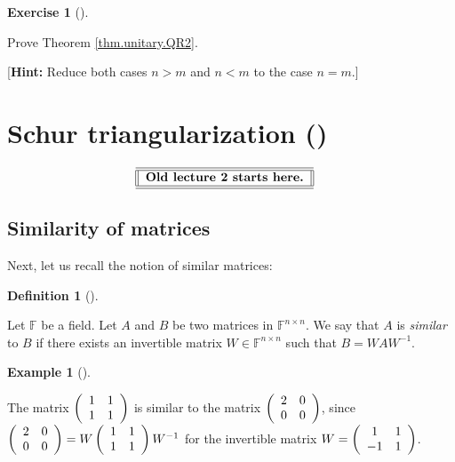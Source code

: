 \documentclass[numbers=enddot,12pt,final,onecolumn,notitlepage]{scrartcl}%
\newcounter{exer}
\numberwithin{exer}{subsection}
\theoremstyle{definition}
\newtheorem{defi}[theo]{Definition}
\newenvironment{definition}[1][]
{\begin{defi}[#1]\begin{leftbar}}
{\end{leftbar}\end{defi}}
\newtheorem{exam}[theo]{Example}
\newenvironment{example}[1][]
{\begin{exam}[#1]\begin{leftbar}}
{\end{leftbar}\end{exam}}
\newtheorem{exmp}[exer]{Exercise}
\newenvironment{exercise}[1][]
{\begin{exmp}[#1]\begin{leftbar}}
{\end{leftbar}\end{exmp}}
\newenvironment{noncompile}{}{}
\begin{document}
\begin{exercise}
\label{exe.unitary.QR2} Prove Theorem \ref{thm.unitary.QR2}.

[\textbf{Hint:} Reduce both cases $n>m$ and $n<m$ to the case $n=m$.]
\end{exercise}

\section{Schur triangularization (\cite[Chapter 2]{HorJoh13})}

\begin{noncompile}%
\[%
\begin{tabular}
[c]{||l||}\hline\hline
\textbf{Old lecture 2 starts here.}\\\hline\hline
\end{tabular}
\ \ \
\]

\end{noncompile}

\subsection{Similarity of matrices}

Next, let us recall the notion of similar matrices:

\begin{definition}
\label{def.schurtri.similar.def}Let $\mathbb{F}$ be a field. Let $A$ and $B$
be two matrices in $\mathbb{F}^{n\times n}$. We say that $A$ is \emph{similar}
to $B$ if there exists an invertible matrix $W\in\mathbb{F}^{n\times n}$ such
that $B=WAW^{-1}$.
\end{definition}

\begin{example}
The matrix $\left(
\begin{array}
[c]{cc}%
1 & 1\\
1 & 1
\end{array}
\right)  $ is similar to the matrix $\left(
\begin{array}
[c]{cc}%
2 & 0\\
0 & 0
\end{array}
\right)  $, since $\left(
\begin{array}
[c]{cc}%
2 & 0\\
0 & 0
\end{array}
\right)  =W\left(
\begin{array}
[c]{cc}%
1 & 1\\
1 & 1
\end{array}
\right)  W^{-1}$ for the invertible matrix $W=\left(
\begin{array}
[c]{cc}%
1 & 1\\
-1 & 1
\end{array}
\right)  $.
\end{example}
\end{document}
